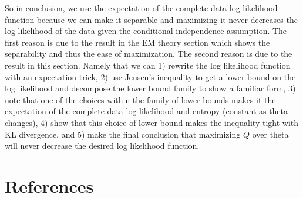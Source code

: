 \documentclass[11pt]{article}
\begin{document}
So in conclusion, we use the expectation of the complete data log likelihood function because we can make it separable and maximizing it never decreases the log likelihood of the data given the conditional independence assumption. The first reason is due to the result in the EM theory section which shows the separability and thus the ease of maximization. The second reason is due to the result in this section. Namely that we can 1) rewrite the log likelihood function with an expectation trick, 2) use Jensen's inequality to get a lower bound on the log likelihood and decompose the lower bound family to show a familiar form, 3) note that one of the choices within the family of lower bounds makes it the expectation of the complete data log likelihood and entropy (constant as theta changes), 4) show that this choice of lower bound makes the inequality tight with KL divergence, and 5) make the final conclusion that maximizing $Q$ over theta will never decrease the desired log likelihood function.

\section*{References}
\end{document}
